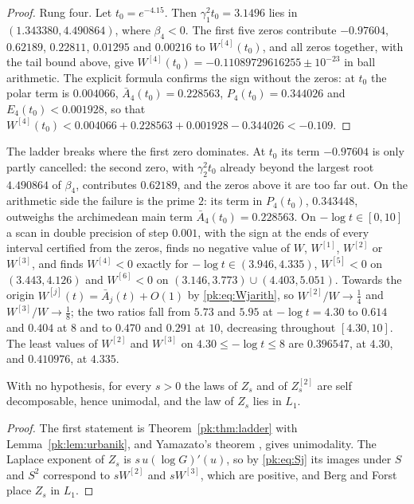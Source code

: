 \begin{proof}
Rung four. Let $t_0=e^{-4.15}$. Then $\gamma_1^2t_0=3.1496$ lies in $(1.343380,4.490864)$, where $\beta_4<0$. The first five zeros contribute $-0.97604$, $0.62189$, $0.22811$, $0.01295$ and $0.00216$ to $W^{[4]}(t_0)$, and all zeros together, with the tail bound above, give $W^{[4]}(t_0)=-0.11089729616255\pm10^{-23}$ in ball arithmetic. The explicit formula confirms the sign without the zeros: at $t_0$ the polar term is $0.004066$, $\bar A_4(t_0)=0.228563$, $P_4(t_0)=0.344026$ and $E_4(t_0)<0.001928$, so that $W^{[4]}(t_0)<0.004066+0.228563+0.001928-0.344026<-0.109$.
\end{proof}

The ladder breaks where the first zero dominates. At $t_0$ its term $-0.97604$ is only partly cancelled: the second zero, with $\gamma_2^2t_0$ already beyond the largest root $4.490864$ of $\beta_4$, contributes $0.62189$, and the zeros above it are too far out. On the arithmetic side the failure is the prime $2$: its term in $P_4(t_0)$, $0.343448$, outweighs the archimedean main term $\bar A_4(t_0)=0.228563$. On $-\log t\in[0,10]$ a scan in double precision of step $0.001$, with the sign at the ends of every interval certified from the zeros, finds no negative value of $W$, $W^{[1]}$, $W^{[2]}$ or $W^{[3]}$, and finds $W^{[4]}<0$ exactly for $-\log t\in(3.946,4.335)$, $W^{[5]}<0$ on $(3.443,4.126)$ and $W^{[6]}<0$ on $(3.146,3.773)\cup(4.403,5.051)$. Towards the origin $W^{[j]}(t)=\bar A_j(t)+O(1)$ by \eqref{pk:eq:Wjarith}, so $W^{[2]}/W\to\frac14$ and $W^{[3]}/W\to\frac18$; the two ratios fall from $5.73$ and $5.95$ at $-\log t=4.30$ to $0.614$ and $0.404$ at $8$ and to $0.470$ and $0.291$ at $10$, decreasing throughout $[4.30,10]$. The least values of $W^{[2]}$ and $W^{[3]}$ on $4.30\le-\log t\le8$ are $0.396547$, at $4.30$, and $0.410976$, at $4.335$.

\begin{corollary}\label{pk:cor:unimodal}
With no hypothesis, for every $s>0$ the laws of $Z_s$ and of $Z^{[2]}_s$ are self decomposable, hence unimodal, and the law of $Z_s$ lies in $L_1$.
\end{corollary}

\begin{proof}
The first statement is Theorem~\ref{pk:thm:ladder} with Lemma~\ref{pk:lem:urbanik}, and Yamazato's theorem \cite{Yamazato78}, \cite[Theorem 53.1]{Sato99} gives unimodality. The Laplace exponent of $Z_s$ is $s\,u(\log G)'(u)$, so by \eqref{pk:eq:Sj} its images under $S$ and $S^2$ correspond to $sW^{[2]}$ and $sW^{[3]}$, which are positive, and Berg and Forst place $Z_s$ in $L_1$.
\end{proof}

